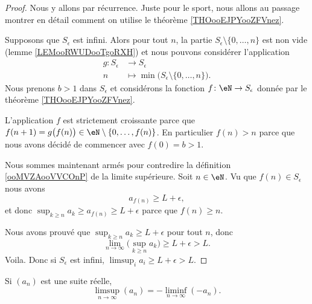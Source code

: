 \begin{proof}
	Nous y allons par récurrence. Juste pour le sport, nous allons au passage montrer en détail comment on utilise le théorème \ref{THOooEJPYooZFVnez}.


	Supposons que \( S_{\epsilon}\) est infini. Alors pour tout \( n\), la partie \( S_{\epsilon}\setminus\{ 0,\ldots, n \}\) est non vide (lemme \ref{LEMooRWUDooTgoRXH}) et nous pouvons considérer l'application
	\begin{equation}
		\begin{aligned}
			g\colon S_{\epsilon} & \to S_{\epsilon}                                                \\
			n                    & \mapsto \min\big( S_{\epsilon}\setminus\{ 0,\ldots, n \} \big).
		\end{aligned}
	\end{equation}
	Nous prenons \( b>1\) dans \( S_{\epsilon}\) et considérons la fonction \( f\colon \eN\to S_{\epsilon}\) donnée par le théorème \ref{THOooEJPYooZFVnez}.

	L'application \( f\) est strictement croissante parce que \( f(n+1)=g\big( f(n) \big)\in \eN\setminus\{ 0,\ldots, f(n) \}\). En particulier \( f(n)>n\) parce que nous avons décidé de commencer avec \( f(0)=b>1\).

	Nous sommes maintenant armés pour contredire la définition \ref{ooMVZAooVVCOnP} de la limite supérieure. Soit \( n\in \eN\). Vu que \( f(n)\in S_{\epsilon}\) nous avons
	\begin{equation}
		a_{f(n)}\geq L+\epsilon,
	\end{equation}
	et donc \( \sup_{k\geq n}a_k\geq a_{f(n)}\geq L+\epsilon\) parce que \( f(n)\geq n\).

	Nous avons prouvé que \( \sup_{k\geq n}a_k\geq L+\epsilon\) pour tout \( n\), donc
	\begin{equation}
		\lim_{n\to \infty} \big( \sup_{k\geq n}a_k \big)\geq L+\epsilon>L.
	\end{equation}
	Voila. Donc si \( S_{\epsilon}\) est infini, \( \limsup_ia_i\geq L+\epsilon>L\).
\end{proof}

\begin{lemma}       \label{LEMooMTRDooBMxFmn}
    Si \( (a_n)\) est une suite réelle,
    \begin{equation}
        \limsup_{n\to\infty}(a_n)=-\liminf_{n\to\infty}(-a_n).
    \end{equation}
\end{lemma}

